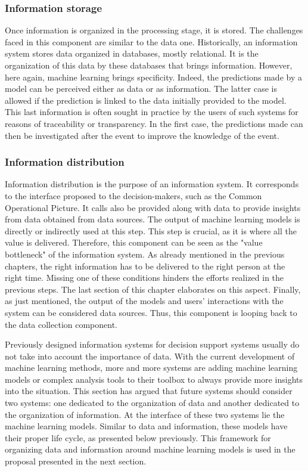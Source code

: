 \subsubsection{Information storage}
Once information is organized in the processing stage, it is stored.
The challenges faced in this component are similar to the data one.
Historically, an information system stores data organized in databases, mostly relational.
It is the organization of this data by these databases that brings information.
However, here again, machine learning brings specificity.
Indeed, the predictions made by a model can be perceived either as data or as information.
The latter case is allowed if the prediction is linked to the data initially provided to the model.
This last information is often sought in practice by the users of such systems for reasons of traceability or transparency.
In the first case, the predictions made can then be investigated after the event to improve the knowledge of the event.

\subsubsection{Information distribution}
\label{sec:information-distribution}
Information distribution is the purpose of an information system.
It corresponds to the interface proposed to the decision-makers, such as the Common Operational Picture.
It calls also be provided along with data to provide insights from data obtained from data sources.
The output of machine learning models is directly or indirectly used at this step.
This step is crucial, as it is where all the value is delivered.
Therefore, this component can be seen as the "value bottleneck" of the information system.
As already mentioned in the previous chapters, the right information has to be delivered to the right person at the right time.
Missing one of these conditions hinders the efforts realized in the previous steps.
The last section of this chapter elaborates on this aspect.
Finally, as just mentioned, the output of the models and users' interactions with the system can be considered data sources.
Thus, this component is looping back to the data collection component.

Previously designed information systems for decision support systems usually do not take into account the importance of data.
With the current development of machine learning methods, more and more systems are
adding machine learning models or complex analysis tools to their toolbox to always provide more insights into the situation.
This section has argued that future systems should consider two systems: one
dedicated to the organization of data and another dedicated to the organization of information.
At the interface of these two systems lie the machine learning models.
Similar to data and information, these models have their proper life cycle, as presented below previously.
This framework for organizing data and information around machine learning models is used
in the proposal presented in the next section.

